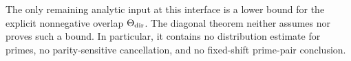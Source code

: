 The only remaining analytic input at this interface is a lower bound
for the explicit nonnegative overlap
\(\Theta_{\rm dir}\).  The diagonal theorem neither assumes nor proves
such a bound.  In particular, it contains no distribution estimate for
primes, no parity-sensitive cancellation, and no fixed-shift
prime-pair conclusion.
